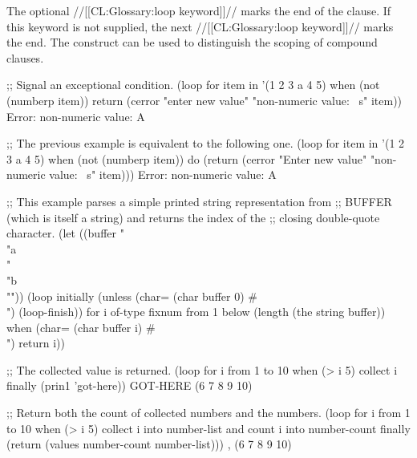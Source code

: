  
The optional //[[CL:Glossary:loop keyword]]//  marks the end of the clause.  If this
keyword is not supplied, the next //[[CL:Glossary:loop keyword]]// marks the end.  The construct
 can be used to distinguish the scoping of compound clauses.
 

\code
;; Signal an exceptional condition.
 (loop for item in '(1 2 3 a 4 5)
       when (not (numberp item))
        return (cerror "enter new value" "non-numeric value: ~s" item))
Error: non-numeric value: A
 
;; The previous example is equivalent to the following one.
 (loop for item in '(1 2 3 a 4 5)
       when (not (numberp item))
        do (return 
            (cerror "Enter new value" "non-numeric value: ~s" item)))
Error: non-numeric value: A
\endcode


\code
;; This example parses a simple printed string representation from 
;; BUFFER (which is itself a string) and returns the index of the
;; closing double-quote character.
 (let ((buffer "\\"a\\" \\"b\\""))
   (loop initially (unless (char= (char buffer 0) #\\")
                     (loop-finish))
         for i of-type fixnum from 1 below (length (the string buffer))
         when (char= (char buffer i) #\\")
          return i))
 
;; The collected value is returned.
 (loop for i from 1 to 10
       when (> i 5)
         collect i
       finally (prin1 'got-here))
\OUT GOT-HERE
\EV (6 7 8 9 10) 

;; Return both the count of collected numbers and the numbers.
 (loop for i from 1 to 10
       when (> i 5)
         collect i into number-list
         and count i into number-count
       finally (return (values number-count number-list)))
, (6 7 8 9 10)
\endcode
 
\endsubsubsection%

\endsubsection%

                                          

